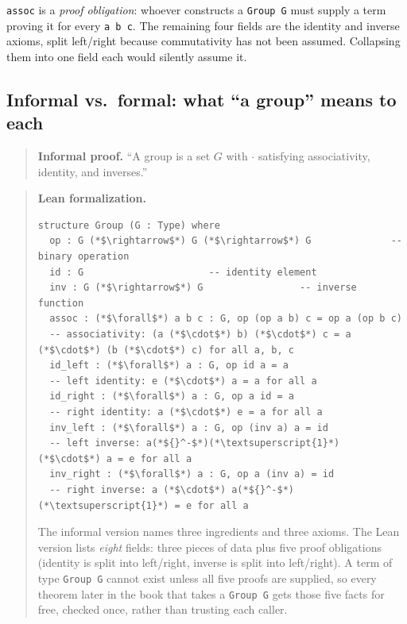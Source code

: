 \texttt{assoc} is a \emph{proof obligation}: whoever constructs a \texttt{Group G} must supply a term proving it for every \texttt{a b c}. The remaining four fields are the identity and inverse axioms, split left/right because commutativity has not been assumed. Collapsing them into one field each would silently assume it.

\subsection{Informal vs.~formal: what ``a group'' means to each}\label{sec:07-groups:02-translating:2}

\begin{quote}
\textbf{Informal proof.} ``A group is a set \(G\) with \(\cdot\) satisfying associativity, identity, and inverses.''
\end{quote}

\begin{quote}
\textbf{Lean formalization.}

\begin{lstlisting}
structure Group (G : Type) where
  op : G (*$\rightarrow$*) G (*$\rightarrow$*) G              -- binary operation
  id : G                      -- identity element
  inv : G (*$\rightarrow$*) G                 -- inverse function
  assoc : (*$\forall$*) a b c : G, op (op a b) c = op a (op b c)
  -- associativity: (a (*$\cdot$*) b) (*$\cdot$*) c = a (*$\cdot$*) (b (*$\cdot$*) c) for all a, b, c
  id_left : (*$\forall$*) a : G, op id a = a
  -- left identity: e (*$\cdot$*) a = a for all a
  id_right : (*$\forall$*) a : G, op a id = a
  -- right identity: a (*$\cdot$*) e = a for all a
  inv_left : (*$\forall$*) a : G, op (inv a) a = id
  -- left inverse: a(*${}^-$*)(*\textsuperscript{1}*) (*$\cdot$*) a = e for all a
  inv_right : (*$\forall$*) a : G, op a (inv a) = id
  -- right inverse: a (*$\cdot$*) a(*${}^-$*)(*\textsuperscript{1}*) = e for all a
\end{lstlisting}

The informal version names three ingredients and three axioms. The Lean version lists \emph{eight} fields: three pieces of data plus five proof obligations (identity is split into left/right, inverse is split into left/right). A term of type \texttt{Group G} cannot exist unless all five proofs are supplied, so every theorem later in the book that takes a \texttt{Group G} gets those five facts for free, checked once, rather than trusting each caller.
\end{quote}

